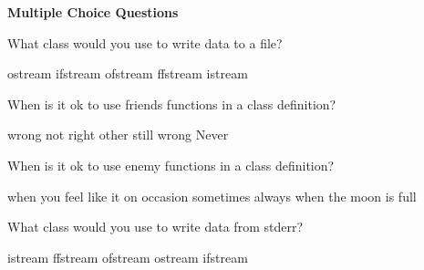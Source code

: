 \documentclass[10pt,addpoints]{exam}
\begin{document}
\begin{questions}
\begin{minipage}{\linewidth}
\medskip
\end{minipage}


\newpage
\begin{center}
{\Large \textbf{Multiple Choice Questions}}
\end{center}

\par\vspace{0.100000in}\begin{minipage}{\linewidth}
\question[2]
What class would you use to write data to a file?
\medskip
\begin{choices}
\choice ostream
\choice ifstream
\choice ofstream
\choice ffstream
\choice istream
\end{choices}
\setlength\answerlinelength{1in}
\answerline[C]

\end{minipage}


\par\vspace{0.100000in}\begin{minipage}{\linewidth}
\question[2]
When is it ok to use friends functions in a class definition?
\medskip
\begin{choices}
\choice wrong
\choice not right
\choice other
\choice still wrong
\choice Never
\end{choices}
\setlength\answerlinelength{1in}
\answerline[E]

\end{minipage}


\par\vspace{0.100000in}\begin{minipage}{\linewidth}
\question[2]
When is it ok to use enemy functions in a class definition?
\medskip
\begin{choices}
\choice when you feel like it
\choice on occasion
\choice sometimes
\choice always
\choice when the moon is full
\end{choices}
\setlength\answerlinelength{1in}
\answerline[D]

\end{minipage}


\par\vspace{0.100000in}\begin{minipage}{\linewidth}
\question[2]
What class would you use to write data from stderr?
\medskip
\begin{choices}
\choice istream
\choice ffstream
\choice ofstream
\choice ostream
\choice ifstream
\end{choices}
\setlength\answerlinelength{1in}
\answerline[D]


\end{minipage}
\end{questions}
\end{document}
